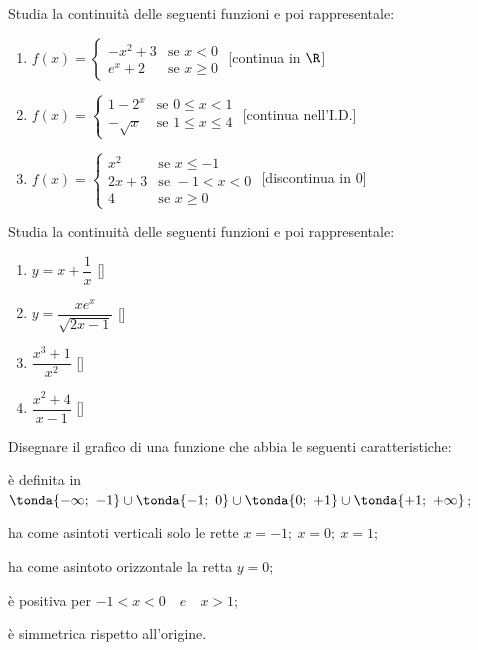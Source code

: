 \begin{esercizio}\label{ese:03.1}
Studia la continuità delle seguenti funzioni e poi rappresentale:
 \begin{enumerate} [label=\alph*]
  \item 
  \(f(x)=\begin{cases} 
    -x^2+3 & \mbox{se } x < 0 \\ 
    e^x+2 & \mbox{se } x \geqslant 0
  \end{cases}\)
  \hfill [continua in \(\R\)]
  \item 
  \(f(x)=\begin{cases} 
    1-2^x & \mbox{se } 0 \leqslant x < 1 \\ 
    -\sqrt{x} & \mbox{se } 1 \leqslant x \leqslant 4
  \end{cases}\)
  \hfill [continua nell'I.D.]
  \item 
  \(f(x)=\begin{cases} 
    x^2 & \mbox{se } x \leqslant -1 \\ 
    2x+3 & \mbox{se } -1 < x < 0 \\
    4 & \mbox{se } x \geqslant 0
  \end{cases}\)
  \hfill [discontinua in 0]
 \end{enumerate}
\end{esercizio}

\begin{esercizio}\label{ese:03.1}
Studia la continuità delle seguenti funzioni e poi rappresentale:
\begin{multicols}{2}
 \begin{enumerate} [label=\alph*]
  \item \(y = x+\dfrac{1}{x}\) \hfill [\(\)]
  \item \(y = \dfrac{xe^x}{\sqrt{2x-1}}\) \hfill [\(\)]
  \item \(\dfrac{x^3+1}{x^2}\) \hfill [\(\)]
  \item \(\dfrac{x^2+4}{x-1}\) \hfill [\(\)]
 \end{enumerate}
\end{multicols}
\end{esercizio}

\begin{esercizio}\label{ese:03.1}
Disegnare il grafico di una funzione che abbia le seguenti caratteristiche:
 \begin{enumeratea}
  \item è definita in \(\tonda{-\infty;~-1} \cup \tonda{-1;~0} \cup 
                        \tonda{0;~+1} \cup \tonda{+1;~+\infty}\);
  \item ha come asintoti verticali solo le rette \(x= -1;~x=0;~x=1\);
  \item ha come asintoto orizzontale la retta \(y=0\);
  \item è positiva per \(-1<x<0 \quad e \quad x>1\);
  \item è simmetrica rispetto all’origine.
 \end{enumeratea}
\end{esercizio}
